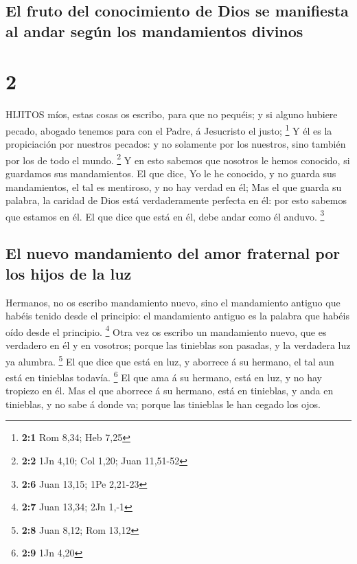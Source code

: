 \hypertarget{el-fruto-del-conocimiento-de-dios-se-manifiesta-al-andar-seguxfan-los-mandamientos-divinos}{%
\subsection{El fruto del conocimiento de Dios se manifiesta al andar
según los mandamientos
divinos}\label{el-fruto-del-conocimiento-de-dios-se-manifiesta-al-andar-seguxfan-los-mandamientos-divinos}}

\hypertarget{section-1}{%
\section{2}\label{section-1}}

 HIJITOS míos, estas cosas os escribo, para que no pequéis;
y si alguno hubiere pecado, abogado tenemos para con el Padre, á
Jesucristo el justo; \footnote{\textbf{2:1} Rom 8,34; Heb 7,25}
 Y él es la propiciación por nuestros pecados: y no
solamente por los nuestros, sino también por los de todo el mundo.
\footnote{\textbf{2:2} 1Jn 4,10; Col 1,20; Juan 11,51-52}  Y
en esto sabemos que nosotros le hemos conocido, si guardamos sus
mandamientos.  El que dice, Yo le he conocido, y no guarda
sus mandamientos, el tal es mentiroso, y no hay verdad en él;
 Mas el que guarda su palabra, la caridad de Dios está
verdaderamente perfecta en él: por esto sabemos que estamos en él.
 El que dice que está en él, debe andar como él anduvo.
\footnote{\textbf{2:6} Juan 13,15; 1Pe 2,21-23}

\hypertarget{el-nuevo-mandamiento-del-amor-fraternal-por-los-hijos-de-la-luz}{%
\subsection{El nuevo mandamiento del amor fraternal por los hijos de la
luz}\label{el-nuevo-mandamiento-del-amor-fraternal-por-los-hijos-de-la-luz}}

 Hermanos, no os escribo mandamiento nuevo, sino el
mandamiento antiguo que habéis tenido desde el principio: el mandamiento
antiguo es la palabra que habéis oído desde el principio. \footnote{\textbf{2:7}
  Juan 13,34; 2Jn 1,-1}  Otra vez os escribo un mandamiento
nuevo, que es verdadero en él y en vosotros; porque las tinieblas son
pasadas, y la verdadera luz ya alumbra. \footnote{\textbf{2:8} Juan
  8,12; Rom 13,12}  El que dice que está en luz, y aborrece
á su hermano, el tal aun está en tinieblas todavía. \footnote{\textbf{2:9}
  1Jn 4,20}  El que ama á su hermano, está en luz, y no hay
tropiezo en él.  Mas el que aborrece á su hermano, está en
tinieblas, y anda en tinieblas, y no sabe á donde va; porque las
tinieblas le han cegado los ojos.

